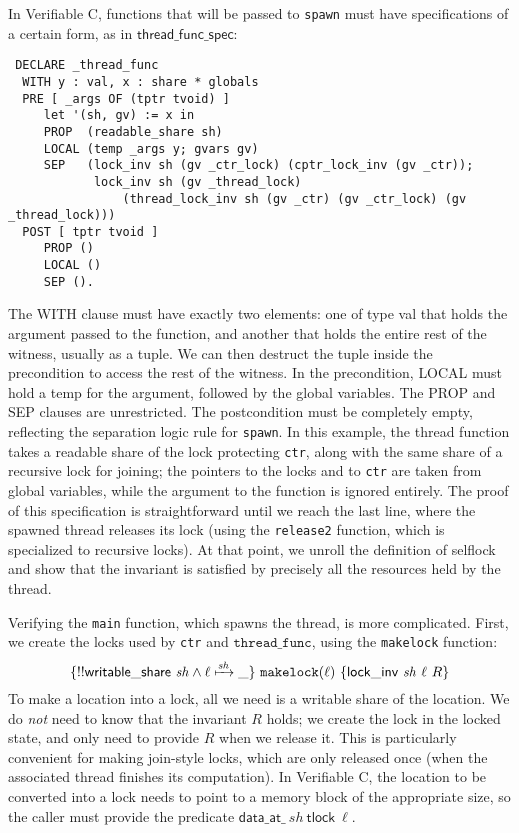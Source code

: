 \documentclass[11pt]{article}
\begin{document}
In Verifiable C, functions that will be passed to \texttt{spawn} must have specifications of a certain form, as in $\mathsf{thread\_func\_spec}$:
\begin{verbatim}
 DECLARE _thread_func
  WITH y : val, x : share * globals
  PRE [ _args OF (tptr tvoid) ]
     let '(sh, gv) := x in
     PROP  (readable_share sh)
     LOCAL (temp _args y; gvars gv)
     SEP   (lock_inv sh (gv _ctr_lock) (cptr_lock_inv (gv _ctr));
            lock_inv sh (gv _thread_lock)
                (thread_lock_inv sh (gv _ctr) (gv _ctr_lock) (gv _thread_lock)))
  POST [ tptr tvoid ]
     PROP ()
     LOCAL ()
     SEP ().
\end{verbatim}
The \textsf{WITH} clause must have exactly two elements: one of type \textsf{val} that holds the argument passed to the function, and another that holds the entire rest of the witness, usually as a tuple. We can then destruct the tuple inside the precondition to access the rest of the witness. In the precondition, \textsf{LOCAL} must hold a \textsf{temp} for the argument, followed by the global variables. The \textsf{PROP} and \textsf{SEP} clauses are unrestricted. The postcondition must be completely empty, reflecting the separation logic rule for \texttt{spawn}. In this example, the thread function takes a readable share of the lock protecting \texttt{ctr}, along with the same share of a recursive lock for joining; the pointers to the locks and to \texttt{ctr} are taken from global variables, while the argument to the function is ignored entirely. The proof of this specification is straightforward until we reach the last line, where the spawned thread releases its lock (using the \texttt{release2} function, which is specialized to recursive locks). At that point, we unroll the definition of \textsf{selflock} and show that the invariant is satisfied by precisely all the resources held by the thread.

Verifying the \texttt{main} function, which spawns the thread, is more complicated. First, we create the locks used by \texttt{ctr} and $\mathtt{thread\_func}$, using the \texttt{makelock} function:
$$\{!!\mathsf{writable\_share}\ \mathit{sh} \land \ell \xmapsto{\mathit{sh}} \_\}\ \texttt{makelock}(\ell)\ \{\mathsf{lock\_inv}\ \mathit{sh}\ \ell\ R\}$$
To make a location into a lock, all we need is a writable share of the location. We do \emph{not} need to know that the invariant $R$ holds; we create the lock in the locked state, and only need to provide $R$ when we release it. This is particularly convenient for making join-style locks, which are only released once (when the associated thread finishes its computation). In Verifiable C, the location to be converted into a lock needs to point to a memory block of the appropriate size, so the caller must provide the predicate $\mathsf{data\_at\_}\ \mathit{sh}\ \mathsf{tlock}\ \ell$.
\end{document}
